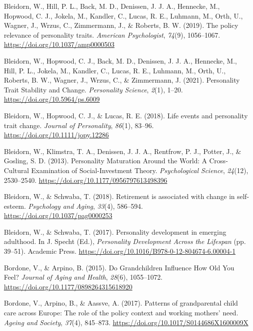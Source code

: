 \documentclass[
  english,
  man, noextraspace]{apa7}
\begin{document}
\leavevmode\hypertarget{ref-bleidornPolicyRelevancePersonality2019}{}%
Bleidorn, W., Hill, P. L., Back, M. D., Denissen, J. J. A., Hennecke, M., Hopwood, C. J., Jokela, M., Kandler, C., Lucas, R. E., Luhmann, M., Orth, U., Wagner, J., Wrzus, C., Zimmermann, J., \& Roberts, B. W. (2019). The policy relevance of personality traits. \emph{American Psychologist}, \emph{74}(9), 1056--1067. \url{https://doi.org/10.1037/amp0000503}

\leavevmode\hypertarget{ref-bleidornPersonalityTraitStability2021}{}%
Bleidorn, W., Hopwood, C. J., Back, M. D., Denissen, J. J. A., Hennecke, M., Hill, P. L., Jokela, M., Kandler, C., Lucas, R. E., Luhmann, M., Orth, U., Roberts, B. W., Wagner, J., Wrzus, C., \& Zimmermann, J. (2021). Personality Trait Stability and Change. \emph{Personality Science}, \emph{2}(1), 1--20. \url{https://doi.org/10.5964/ps.6009}

\leavevmode\hypertarget{ref-bleidornLifeEventsPersonality2018}{}%
Bleidorn, W., Hopwood, C. J., \& Lucas, R. E. (2018). Life events and personality trait change. \emph{Journal of Personality}, \emph{86}(1), 83--96. \url{https://doi.org/10.1111/jopy.12286}

\leavevmode\hypertarget{ref-bleidornPersonalityMaturationWorld2013}{}%
Bleidorn, W., Klimstra, T. A., Denissen, J. J. A., Rentfrow, P. J., Potter, J., \& Gosling, S. D. (2013). Personality Maturation Around the World: A Cross-Cultural Examination of Social-Investment Theory. \emph{Psychological Science}, \emph{24}(12), 2530--2540. \url{https://doi.org/10.1177/0956797613498396}

\leavevmode\hypertarget{ref-bleidornRetirementAssociatedChange2018}{}%
Bleidorn, W., \& Schwaba, T. (2018). Retirement is associated with change in self-esteem. \emph{Psychology and Aging}, \emph{33}(4), 586--594. \url{https://doi.org/10.1037/pag0000253}

\leavevmode\hypertarget{ref-bleidornPersonalityDevelopmentEmerging2017}{}%
Bleidorn, W., \& Schwaba, T. (2017). Personality development in emerging adulthood. In J. Specht (Ed.), \emph{Personality Development Across the Lifespan} (pp. 39--51). Academic Press. \url{https://doi.org/10.1016/B978-0-12-804674-6.00004-1}

\leavevmode\hypertarget{ref-bordoneGrandchildrenInfluenceHow2015}{}%
Bordone, V., \& Arpino, B. (2015). Do Grandchildren Influence How Old You Feel? \emph{Journal of Aging and Health}, \emph{28}(6), 1055--1072. \url{https://doi.org/10.1177/0898264315618920}

\leavevmode\hypertarget{ref-bordonePatternsGrandparentalChild2017}{}%
Bordone, V., Arpino, B., \& Aassve, A. (2017). Patterns of grandparental child care across Europe: The role of the policy context and working mothers' need. \emph{Ageing and Society}, \emph{37}(4), 845--873. \url{https://doi.org/10.1017/S0144686X1600009X}
\end{document}
